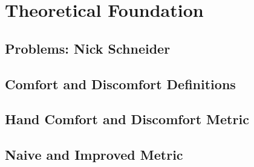 \chapter{Theoretical Foundation}\label{chapter:theory}

\section{Problems: Nick Schneider}

\section{Comfort and Discomfort Definitions}

\section{Hand Comfort and Discomfort Metric}

\section{Naive and Improved Metric}
